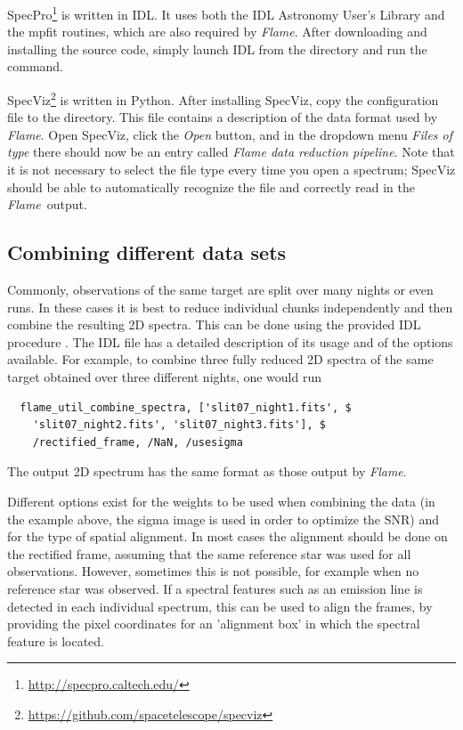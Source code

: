 \documentclass[a4paper]{article}
\newcommand{\flame}{\emph{Flame}}
\begin{document}
\begin{sloppypar}
SpecPro\footnote{\url{http://specpro.caltech.edu/}} is written in IDL. It uses both the IDL Astronomy User's Library and the mpfit routines, which are also required by \flame. After downloading and installing the source code, simply launch IDL from the  directory and run the  command.

SpecViz\footnote{\url{https://github.com/spacetelescope/specviz}} is written in Python. After installing SpecViz, copy the configuration file  to the  directory. This file contains a description of the data format used by \flame. Open SpecViz, click the \emph{Open} button, and in the dropdown menu \emph{Files of type} there should now be an entry called \emph{Flame data reduction pipeline}. Note that it is not necessary to select the file type every time you open a spectrum; SpecViz should be able to automatically recognize the file and correctly read in the \flame\ output.


\subsection{Combining different data sets}

Commonly, observations of the same target are split over many nights or even runs. In these cases it is best to reduce individual chunks independently and then combine the resulting 2D spectra. This can be done using the provided IDL procedure . The IDL file has a detailed description of its usage and of the options available. For example, to combine three fully reduced 2D spectra of the same target obtained over three different nights, one would run
\begin{lstlisting}
  flame_util_combine_spectra, ['slit07_night1.fits', $
    'slit07_night2.fits', 'slit07_night3.fits'], $
    /rectified_frame, /NaN, /usesigma
\end{lstlisting}
The output 2D spectrum has the same format as those output by \flame.

Different options exist for the weights to be used when combining the data (in the example above, the sigma image is used in order to optimize the SNR) and for the type of spatial alignment. In most cases the alignment should be done on the rectified frame, assuming that the same reference star was used for all observations. However, sometimes this is not possible, for example when no reference star was observed. If a spectral features such as an emission line is detected in each individual spectrum, this can be used to align the frames, by providing the pixel coordinates for an 'alignment box' in which the spectral feature is located.


\end{sloppypar}
\end{document}
